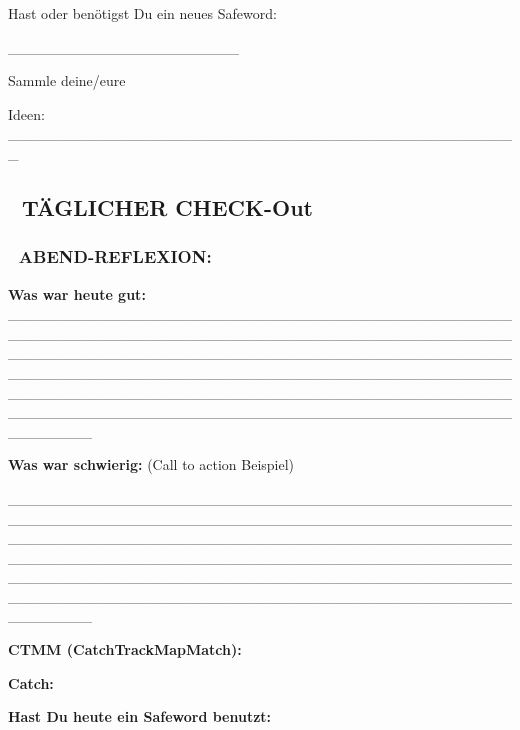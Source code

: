 Hast oder benötigst Du ein neues Safeword:

\_\_\_\_\_\_\_\_\_\_\_\_\_\_\_\_\_\_\_\_\_\_

Sammle deine/eure

Ideen: \_\_\_\_\_\_\_\_\_\_\_\_\_\_\_\_\_\_\_\_\_\_\_\_\_\_\_\_\_\_\_\_\_\_\_\_\_\_\_\_\_\_\_\_\_\_\_\_\_

\hypertarget{tuxe4glicher-check-out}{%
\subsection{\texorpdfstring{📅 \textbf{TÄGLICHER CHECK-Out}}{📅 TÄGLICHER CHECK-Out}}\label{tuxe4glicher-check-out}}

\hypertarget{abend-reflexion}{%
\subsubsection{\texorpdfstring{\textbf{🌙 ABEND-REFLEXION:}}{🌙 ABEND-REFLEXION:}}\label{abend-reflexion}}

\textbf{Was war heute gut:} \_\_\_\_\_\_\_\_\_\_\_\_\_\_\_\_\_\_\_\_\_\_\_\_\_\_\_\_\_\_\_\_\_\_\_\_\_\_\_\_\_\_\_\_\_\_\_\_\_\_\_\_\_\_\_\_\_\_\_\_\_\_\_\_\_\_\_\_\_\_\_\_\_\_\_\_\_\_\_\_\_\_\_\_\_\_\_\_\_\_\_\_\_\_\_\_\_\_\_\_\_\_\_\_\_\_\_\_\_\_\_\_\_\_\_\_\_\_\_\_\_\_\_\_\_\_\_\_\_\_\_\_\_\_\_\_\_\_\_\_\_\_\_\_\_\_\_\_\_\_\_\_\_\_\_\_\_\_\_\_\_\_\_\_\_\_\_\_\_\_\_\_\_\_\_\_\_\_\_\_\_\_\_\_\_\_\_\_\_\_\_\_\_\_\_\_\_\_\_\_\_\_\_\_\_\_\_\_\_\_\_\_\_\_\_\_\_\_\_\_\_\_\_\_\_\_\_\_\_\_\_\_\_\_\_\_\_\_\_\_\_\_\_\_\_\_\_\_\_\_\_\_\_\_\_\_\_\_\_\_\_\_\_\_\_\_\_\_\_\_\_\_\_\_\_\_\_\_\_\_\_\_\_\_\_\_\_\_\_\_\_\_\_\_\_\_

\textbf{Was war schwierig:} (Call to action Beispiel)

\_\_\_\_\_\_\_\_\_\_\_\_\_\_\_\_\_\_\_\_\_\_\_\_\_\_\_\_\_\_\_\_\_\_\_\_\_\_\_\_\_\_\_\_\_\_\_\_\_\_\_\_\_\_\_\_\_\_\_\_\_\_\_\_\_\_\_\_\_\_\_\_\_\_\_\_\_\_\_\_\_\_\_\_\_\_\_\_\_\_\_\_\_\_\_\_\_\_\_\_\_\_\_\_\_\_\_\_\_\_\_\_\_\_\_\_\_\_\_\_\_\_\_\_\_\_\_\_\_\_\_\_\_\_\_\_\_\_\_\_\_\_\_\_\_\_\_\_\_\_\_\_\_\_\_\_\_\_\_\_\_\_\_\_\_\_\_\_\_\_\_\_\_\_\_\_\_\_\_\_\_\_\_\_\_\_\_\_\_\_\_\_\_\_\_\_\_\_\_\_\_\_\_\_\_\_\_\_\_\_\_\_\_\_\_\_\_\_\_\_\_\_\_\_\_\_\_\_\_\_\_\_\_\_\_\_\_\_\_\_\_\_\_\_\_\_\_\_\_\_\_\_\_\_\_\_\_\_\_\_\_\_\_\_\_\_\_\_\_\_\_\_\_\_\_\_\_\_\_\_\_\_\_\_\_\_\_\_\_\_\_\_\_\_\_\_

\textbf{CTMM (CatchTrackMapMatch):}

\textbf{Catch:}

\textbf{Hast Du heute ein Safeword benutzt:}

